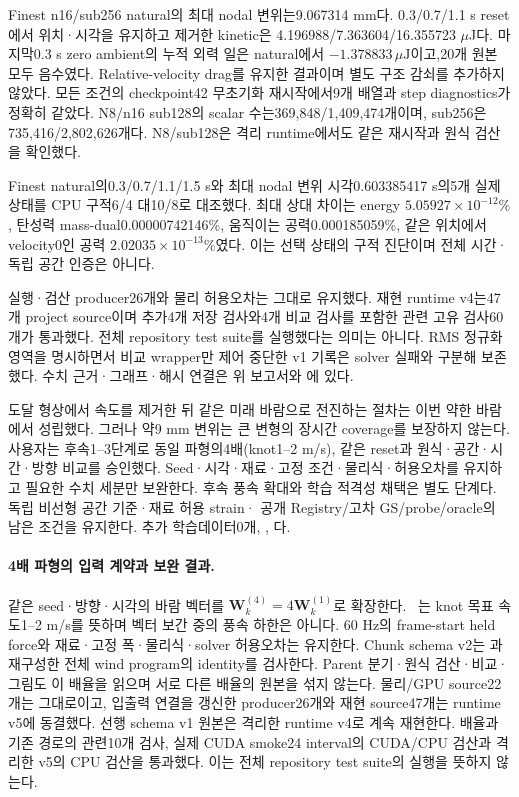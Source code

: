 \documentclass[10pt]{article}
\begin{document}
Finest n16/sub256 natural의 최대 nodal 변위는9.067314 mm다.
0.3/0.7/1.1 s reset에서 위치·시각을 유지하고 제거한 kinetic은
4.196988/7.363604/16.355723 $\mu$J다.
마지막0.3 s zero ambient의 누적 외력 일은 natural에서
\(-1.378833\,\mu\mathrm{J}\)이고,20개 원본 모두 음수였다.
Relative-velocity drag를 유지한 결과이며 별도 구조 감쇠를 추가하지 않았다.
모든 조건의 checkpoint42 무초기화 재시작에서9개 배열과 step diagnostics가 정확히 같았다.
N8/n16 sub128의 scalar 수는369,848/1,409,474개이며,
sub256은735,416/2,802,626개다.
N8/sub128은 격리 runtime에서도 같은 재시작과 원식 검산을 확인했다.

Finest natural의0.3/0.7/1.1/1.5 s와 최대 nodal 변위 시각0.603385417 s의5개 실제 상태를
CPU 구적6/4 대10/8로 대조했다. 최대 상대 차이는 energy \(5.05927\times10^{-12}\%\),
탄성력 mass-dual0.00000742146\%, 움직이는 공력0.000185059\%,
같은 위치에서 velocity0인 공력 \(2.02035\times10^{-13}\%\)였다.
이는 선택 상태의 구적 진단이며 전체 시간·독립 공간 인증은 아니다.

실행·검산 producer26개와 물리 허용오차는 그대로 유지했다. 재현 runtime v4는47개 project
source이며 추가4개 저장 검사와4개 비교 검사를 포함한 관련 고유 검사60개가 통과했다.
전체 repository test suite를 실행했다는 의미는 아니다. RMS 정규화 영역을 명시하면서
비교 wrapper만 제어 중단한 v1 기록은 solver 실패와 구분해 보존했다.
수치 근거·그래프·해시 연결은 위 보고서와 에 있다.

도달 형상에서 속도를 제거한 뒤 같은 미래 바람으로 전진하는 절차는 이번 약한 바람에서 성립했다.
그러나 약9 mm 변위는 큰 변형의 장시간 coverage를 보장하지 않는다. 사용자는 후속1--3단계로
동일 파형의4배(knot1--2 m/s), 같은 reset과 원식·공간·시간·방향 비교를 승인했다.
Seed·시각·재료·고정 조건·물리식·허용오차를 유지하고 필요한 수치 세분만 보완한다.
후속 풍속 확대와 학습 적격성 채택은 별도 단계다. 독립 비선형 공간 기준·재료 허용 strain·
공개 Registry/고차 GS/probe/oracle의 남은 조건을 유지한다. 추가 학습데이터0개, , 다.

\paragraph{4배 파형의 입력 계약과 보완 결과.}
같은 seed·방향·시각의 바람 벡터를 \(\mathbf W_k^{(4)}=4\mathbf W_k^{(1)}\)로 확장한다.
~는 knot 목표 속도1--2 m/s를 뜻하며 벡터 보간 중의 풍속 하한은 아니다.
60 Hz의 frame-start held force와 재료·고정 폭·물리식·solver 허용오차는 유지한다.
Chunk schema v2는 과 재구성한 전체 wind program의 identity를 검사한다.
Parent 분기·원식 검산·비교·그림도 이 배율을 읽으며 서로 다른 배율의 원본을 섞지 않는다.
물리/GPU source22개는 그대로이고, 입출력 연결을 갱신한 producer26개와 재현 source47개는
runtime v5에 동결했다. 선행 schema v1 원본은 격리한 runtime v4로 계속 재현한다.
배율과 기존 경로의 관련10개 검사, 실제 CUDA smoke24 interval의 CUDA/CPU 검산과
격리한 v5의 CPU 검산을 통과했다. 이는 전체 repository test suite의 실행을 뜻하지 않는다.
\end{document}
